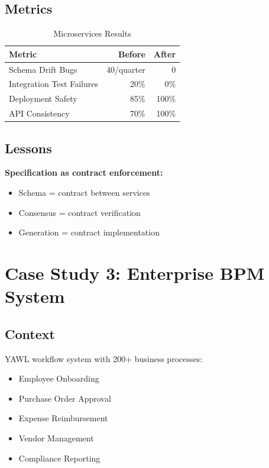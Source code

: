 \subsection{Metrics}

\begin{table}[h]
\centering
\caption{Microservices Results}
\begin{tabular}{lrr}
\toprule
\textbf{Metric} & \textbf{Before} & \textbf{After} \\
\midrule
Schema Drift Bugs & 40/quarter & 0 \\
Integration Test Failures & 20\% & 0\% \\
Deployment Safety & 85\% & 100\% \\
API Consistency & 70\% & 100\% \\
\bottomrule
\end{tabular}
\end{table}

\subsection{Lessons}

\textbf{Specification as contract enforcement:}
\begin{itemize}
    \item Schema = contract between services
    \item Consensus = contract verification
    \item Generation = contract implementation
\end{itemize}

\section{Case Study 3: Enterprise BPM System}

\subsection{Context}

YAWL workflow system with 200+ business processes:
\begin{itemize}
    \item Employee Onboarding
    \item Purchase Order Approval
    \item Expense Reimbursement
    \item Vendor Management
    \item Compliance Reporting
\end{itemize}


